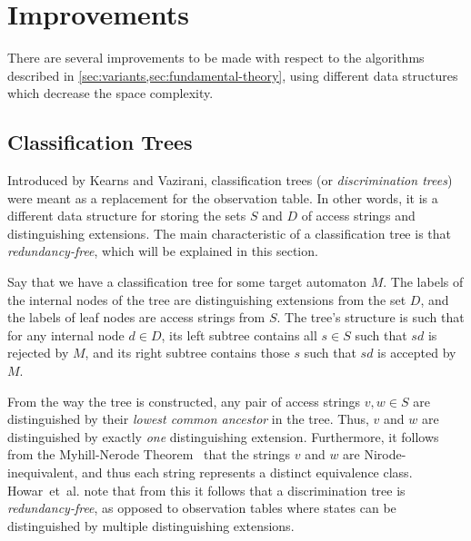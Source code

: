 \documentclass[multi,crop=false,class=article]{standalone}
\begin{document}
\section{Improvements}
\label{sec:improvements}
There are several improvements to be made with respect to the algorithms
described in \cref{sec:variants,sec:fundamental-theory}, using different data
structures which decrease the space complexity.

\subsection{Classification Trees}
\label{sec:classification-trees}
Introduced by Kearns and Vazirani\cite{Kearns94}, classification trees (or
\textit{discrimination trees}) were meant as a replacement for the observation
table. In other words, it is a different data
structure for storing the sets $S$ and $D$ of access strings and distinguishing
extensions. The main characteristic of a classification tree is that
\textit{redundancy-free}, which will be explained in this section.

Say that we have a classification tree for some target automaton $M$. The labels
of the internal nodes of the tree are distinguishing extensions from the set
$D$, and the labels of leaf nodes are access strings from $S$. The tree's
structure is such that for any internal node $d \in D$, its left subtree
contains all $s \in S$ such that $sd$ is rejected by $M$, and its right subtree
contains those $s$ such that $sd$ is accepted by $M$.

From the way the tree is constructed, any pair of access strings $v,w \in S$ are
distinguished by their \textit{lowest common ancestor} in the tree. Thus, $v$
and $w$ are distinguished by exactly \textit{one} distinguishing
extension. Furthermore, it follows from the Myhill-Nerode
Theorem~ that the strings $v$ and $w$ are
Nirode-inequivalent, and thus each string represents a distinct equivalence
class. Howar~et~al. note that from this it follows
that a discrimination tree is \textit{redundancy-free}, as opposed to
observation tables where states can be distinguished by multiple distinguishing
extensions\cite{Howar14}.
\end{document}
